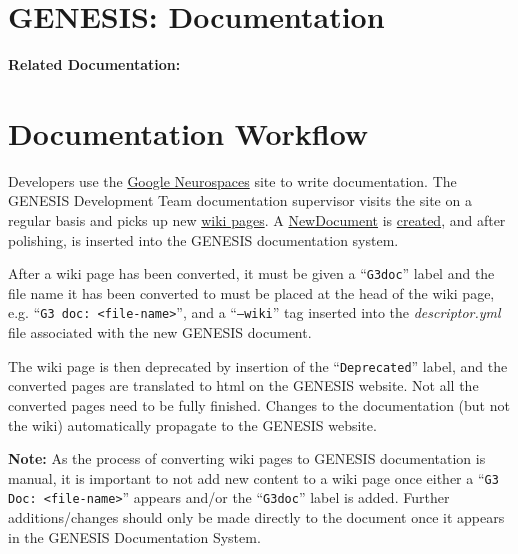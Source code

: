 \documentclass[12pt]{article}
\begin{document}
\section*{GENESIS: Documentation}

{\bf Related Documentation:}

\section*{Documentation Workflow}

Developers use the \href{http://code.google.com/p/neurospaces/wiki/Index}{Google Neurospaces} site to write documentation. The GENESIS Development Team documentation supervisor visits the site on a regular basis and picks up new \href{http://code.google.com/p/neurospaces/w/list}{wiki pages}.  A \href{../NewDocument/NewDocument.tex}{NewDocument} is \href{../document-create/documernt-create.tex}{created}, and after polishing, is inserted into the GENESIS documentation system.

After a wiki page has been converted, it must be given a ``{\tt G3doc}'' label and the file name it has been converted to must be placed at the head of the wiki page, e.g. ``{\tt G3 doc: <file-name>}'', and a ``{\tt --wiki}'' tag inserted into the {\it descriptor.yml} file associated with the new GENESIS document.

The wiki page is then deprecated  by insertion of the ``{\tt Deprecated}'' label, and the converted pages are translated to html on the GENESIS website. Not all the converted pages need to be fully finished. Changes to the documentation (but not the wiki) automatically propagate to the GENESIS website.

{\bf Note:} As the process of converting wiki pages to GENESIS documentation is manual, it is important to not add new content to a wiki page once either a ``{\tt G3 Doc: <file-name>}'' appears and/or the ``{\tt G3doc}'' label is added. Further additions/changes should only be made directly to the document once it appears in the GENESIS Documentation System.
\end{document}
